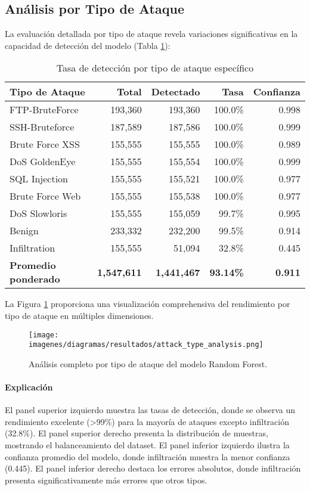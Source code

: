 \subsection{Análisis por Tipo de Ataque}

La evaluación detallada por tipo de ataque revela variaciones significativas en la capacidad de detección del modelo (Tabla \ref{tab:attack_detection}):

\begin{table}[H]
\centering
\begin{tabular}{lrrrr}
\toprule
\textbf{Tipo de Ataque} & \textbf{Total} & \textbf{Detectado} & \textbf{Tasa} & \textbf{Confianza} \\
\midrule
FTP-BruteForce & 193,360 & 193,360 & 100.0\% & 0.998 \\
SSH-Bruteforce & 187,589 & 187,586 & 100.0\% & 0.999 \\
Brute Force XSS & 155,555 & 155,555 & 100.0\% & 0.989 \\
DoS GoldenEye & 155,555 & 155,554 & 100.0\% & 0.999 \\
SQL Injection & 155,555 & 155,521 & 100.0\% & 0.977 \\
Brute Force Web & 155,555 & 155,538 & 100.0\% & 0.977 \\
DoS Slowloris & 155,555 & 155,059 & 99.7\% & 0.995 \\
Benign & 233,332 & 232,200 & 99.5\% & 0.914 \\
Infiltration & 155,555 & 51,094 & 32.8\% & 0.445 \\
\midrule
\textbf{Promedio ponderado} & \textbf{1,547,611} & \textbf{1,441,467} & \textbf{93.14\%} & \textbf{0.911} \\
\bottomrule
\end{tabular}
\caption{Tasa de detección por tipo de ataque específico}
\label{tab:attack_detection}
\end{table}

La Figura \ref{fig:attack_analysis} proporciona una visualización comprehensiva del rendimiento por tipo de ataque en múltiples dimensiones.

\begin{figure}[H]
\centering
\texttt{[image: imagenes/diagramas/resultados/attack\_type\_analysis.png]}
\caption{Análisis completo por tipo de ataque del modelo Random Forest.}
\label{fig:attack_analysis}
\end{figure}

\paragraph{Explicación}
El panel superior izquierdo muestra las tasas de detección, donde se observa un rendimiento excelente (>99\%) para la mayoría de ataques excepto infiltración (32.8\%). El panel superior derecho presenta la distribución de muestras, mostrando el balanceamiento del dataset. El panel inferior izquierdo ilustra la confianza promedio del modelo, donde infiltración muestra la menor confianza (0.445). El panel inferior derecho destaca los errores absolutos, donde infiltración presenta significativamente más errores que otros tipos.
 
